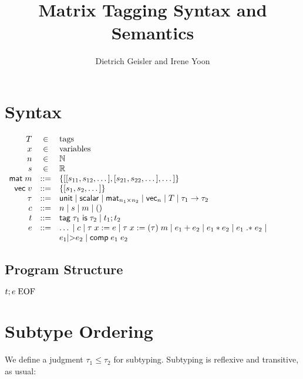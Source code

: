 \documentclass{article}
\begin{document}
\newcommand{\mat}{\mathsf{mat}n_1\textnormal{x}n_2}
\newcommand{\env}[1]{\langle#1,\sigma\rangle}

\mathlig{->}{\rightarrow}
\mathlig{|-}{\vdash}
\mathlig{=>}{\Rightarrow}
\mathligson

\title{Matrix Tagging Syntax and Semantics}
\author{Dietrich Geisler and Irene Yoon}

\section{Syntax}

$\begin{array}{rcl}
T &\in& \text{tags} \\
x &\in& \text{variables} \\
n &\in& \mathbb{N} \\
s &\in& \mathbb{R}\\
\mathsf{mat}\;m&::=&\{[[s_{11},s_{12},\dots],[s_{21},s_{22},\dots],\dots]\}\\
\mathsf{vec}\;v&::=&\{[s_1,s_2,\dots]\}\\
\tau&::=&\mathsf{unit}\;|\;\mathsf{scalar}\;|\; \mathsf{mat}_{n_1{\times}n_2} \;|\;\mathsf{vec}_n\;|\;T\;|\;\tau_1->\tau_2\\
c&::=&n\;|\;s\;|\;m \;|\; ()\\
t&::=&\mathsf{tag}\;\tau_1\;\mathsf{is}\;\tau_2\;|\;t_1;t_2\\
e&::=&\dots\;|\;c\;|\;\tau\;x:=e\;|\;\tau\;x:=(\tau)\;m\;|\;e_1+e_2\;|\;e_1*e_2\;|\;e_1\;\mathsf{.*}\;e_2\;|\\
&&e_1\textnormal{|>}e_2\;|\;\mathsf{comp}\;e_1\;e_2
\end{array}$

\subsection{Program Structure}
$t;e\;\textnormal{EOF}$\\

\section{Subtype Ordering}

We define a judgment $\tau_1 \leq \tau_2$ for subtyping.
Subtyping is reflexive and transitive, as usual:
\end{document}
